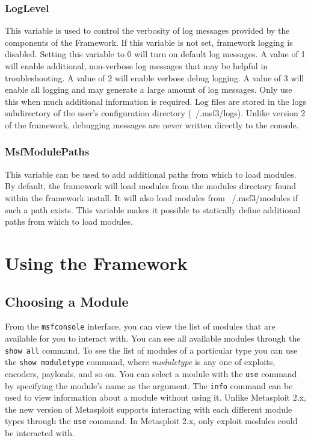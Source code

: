 \documentclass{report}
\begin{document}
	\subsection{LogLevel}
\par
This variable is used to control the verbosity of log messages provided
by the components of the Framework.  If this variable is not set, framework
logging is disabled.  Setting this variable to 0 will turn on default log
messages.  A value of 1 will enable additional, non-verbose log messages that
may be helpful in troubleshooting.  A value of 2 will enable verbose debug
logging.  A value of 3 will enable all logging and may generate a large amount
of log messages.  Only use this when much additional information is required.
Log files are stored in the logs subdirectory of the user's configuration
directory (~/.msf3/logs). Unlike version 2 of the framework, debugging
messages are never written directly to the console.

	\subsection{MsfModulePaths}
\par
This variable can be used to add additional paths from which to load modules.
By default, the framework will load modules from the modules directory found
within the framework install.  It will also load modules from ~/.msf3/modules
if such a path exists.  This variable makes it possible to statically define
additional paths from which to load modules.

\pagebreak

\chapter{Using the Framework}

	\section{Choosing a Module}
\par
From the \texttt{msfconsole} interface, you can view the list of modules that
are available for you to interact with.  You can see all available modules
through the \texttt{show all} command.  To see the list of modules of a
particular type you can use the \texttt{show moduletype} command, where
\textit{moduletype} is any one of exploits, encoders, payloads, and so on.  
You can select a module with the \texttt{use} command by specifying the
module's name as the argument.  The \texttt{info} command can be used to view
information about a module without using it.  Unlike Metasploit 2.x, the new
version of Metasploit supports interacting with each different module types
through the \texttt{use} command.  In Metasploit 2.x, only exploit modules
could be interacted with.
\end{document}
